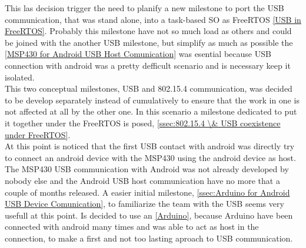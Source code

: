 	This las decision trigger the need to planify a new milestone to port the USB communication, that was stand alone, into a task-based SO as FreeRTOS \autoref{USB in FreeRTOS}. Probably this milestone have not so much load as others and could be joined with the another USB milestone, but simplify as much as possible the \autoref{MSP430 for Android USB Host Comunication} was esential because USB connection with android was a pretty defficult scenario and is necessary keep it isolated.\\

	This two conceptual milestones, USB and 802.15.4 communication, was decided to be develop separately instead of cumulatively to ensure that the work in one is not affected at all by the other one. In this scenario a milestone dedicated to put it together under the FreeRTOS is posed, \autoref{ssec:802.15.4 \& USB coexistence under FreeRTOS}.\\
	At this point is noticed that the first USB contact with android was directly try to connect an android device with the MSP430 using the android device as host. The MSP430 USB communication with Android was not already developed by nobody else and the Android USB host communication have no more that a couple of months released. A easier initial milestone, \autoref{ssec:Arduino for Android USB Device Comunication}, to familiarize the team with the USB seems very usefull at this point. Is decided to use an \autoref{Arduino}, because Arduino have been connected with android many times and was able to act as host in the connection, to make a first and not too lasting aproach to USB communication.

